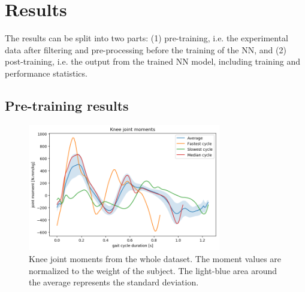 \documentclass[../main.tex]{subfiles}
\begin{document}
\chapter{Results}
The results can be split into two parts: (1) pre-training, i.e. the experimental data after filtering and pre-processing before the training of the \ac{NN}, and (2) post-training, i.e. the output from the trained \ac{NN} model, including training and performance statistics.

\section{Pre-training results}


\begin{figure}
    \centering
    \includegraphics[width=0.75\textwidth]{img/results/knee_joint_moments.png}
    \caption{Knee joint moments from the whole dataset. The moment values are normalized to the weight of the subject. The light-blue area around the average represents the standard deviation.}
    \label{fig:knee-joint-moments-stat}
\end{figure}
\end{document}
